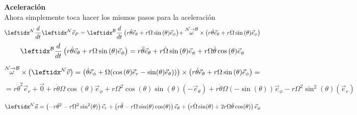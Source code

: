\begin{tcolorbox}[title=Anillo rotador,breakable]
\textbf{Aceleración}\\
Ahora simplemente toca hacer los mismos pasos para la aceleración
$$\der{\marc{}{N}\vec{v}_P}{N}=\transporta{\left(r\dot\theta\vec{e}_\theta +r\Omega\sin{(\theta)}\vec{e}_\phi\right)}{N}{B}$$
$$\der{\left(r\dot\theta\vec{e}_\theta +r\Omega\sin{(\theta)}\vec{e}_\phi\right)}{B}=r\ddot{\theta}\vec{e}_\theta+r\dot\Omega\sin{(\theta)}\vec{e}_\phi+r\Omega\dot\theta\cos{(\theta)}\vec{e}_{\phi}$$

$$\velang{N}{B}\times\left(\marc{\vec{v}}{N}\right)=\left(\dot\theta\vec{e}_\phi+\Omega(\cos{(\theta)}\vec{e}_r-\sin(\theta)\vec{e}_\theta))\right)\times\left(r\dot\theta\vec{e}_\theta +r\Omega\sin{(\theta)}\vec{e}_\phi\right)=$$
$$=r\dot\theta^2 \vec{e}_r+\vec{0}+r\dot\theta\Omega\cos(\theta)\vec{e}_\phi+r\Omega^2\cos(\theta)\sin(\theta)(-\vec{e}_\theta)+r\dot\theta\Omega(-\sin(\theta))\vec{e}_{\phi}-r\Omega^2\sin^2(\theta)(\vec{e}_r)$$

$$\marc{\vec{a}}{N}=\left(-r\dot\theta^2-r\Omega^2\sin^2(\theta)\right)\vec{e}_r+\left(r\ddot{\theta}-r\Omega\sin(\theta)\cos(\theta)\right)\vec{e}_\theta+\left(r\dot\Omega\sin(\theta)+2r\Omega\dot\theta\cos(\theta)\right)\vec{e}_\phi$$

\end{tcolorbox}
\fi
